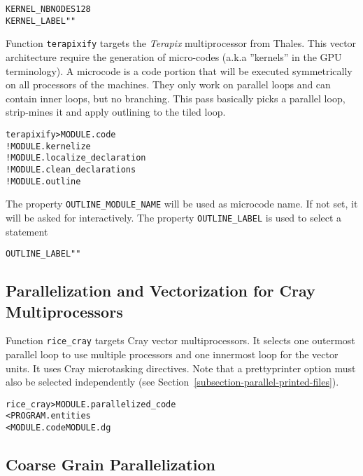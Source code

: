 \documentclass[a4paper]{report}
\newenvironment{PipsProp}{\begin{alltt}}{\end{alltt}}
\newenvironment{PipsMake}{\begin{alltt}}{\end{alltt}}
\begin{document}
\begin{PipsProp}
KERNEL_NBNODES 128
KERNEL_LABEL ""
\end{PipsProp}

Function \verb+terapixify+ targets the {\em Terapix} multiprocessor from Thales.
This vector architecture require the generation of micro-codes (a.k.a ''kernels'' in the GPU terminology).
A microcode is a code portion that will be executed symmetrically on all processors of the machines.
They only work on parallel loops and can contain inner loops, but no branching.
This pass basically picks a parallel loop, strip-mines it and apply outlining to the tiled loop.

\begin{PipsMake}
terapixify				> MODULE.code
		! MODULE.kernelize
		! MODULE.localize_declaration
		! MODULE.clean_declarations
		! MODULE.outline
\end{PipsMake}

The property \verb+OUTLINE_MODULE_NAME+ will be used as microcode name.
If not set, it will be asked for interactively.
The property \verb+OUTLINE_LABEL+ is used to select a statement
\begin{PipsProp}
OUTLINE_LABEL ""
\end{PipsProp}

\subsection{Parallelization and Vectorization for Cray Multiprocessors}

Function \verb+rice_cray+ targets Cray vector multiprocessors. It
selects one outermost parallel loop to use multiple processors and one
innermost loop for the vector units. It uses Cray microtasking
directives. Note that a prettyprinter option must also be selected independently (see
Section~\ref{subsection-parallel-printed-files}).

\begin{PipsMake}
rice_cray                   > MODULE.parallelized_code
        < PROGRAM.entities
        < MODULE.code MODULE.dg
\end{PipsMake}


\subsection{Coarse Grain Parallelization}
\label{subsubsection-coarse-grain-parallelization}
\end{document}
